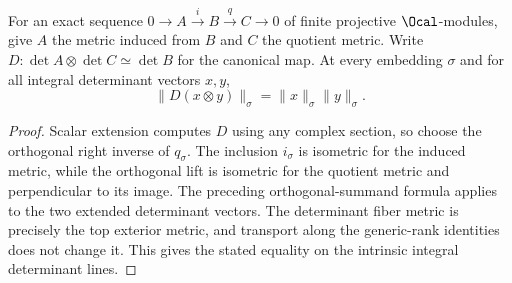 \begin{lemma}
\label{lem:exact-determinant-pure-norm}
\leanok
For an exact sequence $0\to A\xrightarrow{i}B\xrightarrow{q}C\to0$
of finite projective $\Ocal$-modules, give $A$ the metric induced from $B$
and $C$ the quotient metric. Write $D:\det A\otimes\det C\simeq\det B$
for the canonical map. At every embedding $\sigma$ and for all integral
determinant vectors $x,y$,
\[
 \|D(x\otimes y)\|_\sigma=\|x\|_\sigma\|y\|_\sigma.
\]
\end{lemma}
\begin{proof}
Scalar extension computes $D$ using any complex section, so choose the
orthogonal right inverse of $q_\sigma$. The inclusion $i_\sigma$ is
isometric for the induced metric, while the orthogonal lift is isometric
for the quotient metric and perpendicular to its image. The preceding
orthogonal-summand formula applies to the two extended determinant vectors.
The determinant fiber metric is precisely the top exterior metric, and
transport along the generic-rank identities does not change it. This gives
the stated equality on the intrinsic integral determinant lines.
\end{proof}

